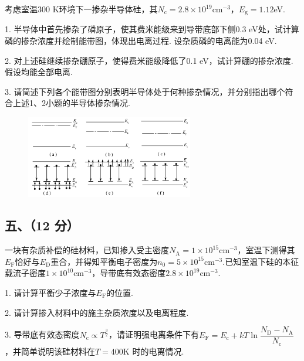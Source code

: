 \documentclass{ctexart}
\begin{document}
考虑室温300 K环境下一掺杂半导体硅，其$N_{\text{c}}=2.8\times 10^{19}$cm$^{-3}$，$E_\text{{g}} = 1.12$eV.\par
1. 半导体中首先掺杂了磷原子，使其费米能级来到导带底部下侧0.3 eV处，试计算磷的掺杂浓度并绘制能带图，体现出电离过程. 设杂质磷的电离能为0.04 eV.\par
2. 对上述硅继续掺杂硼原子，使得费米能级降低了0.1 eV，试计算硼的掺杂浓度. 假设均能全部电离.\par
3. 请简述下列各个能带图分别表明半导体处于何种掺杂情况，并分别指出哪个符合上述1、2小题的半导体掺杂情况.
\vspace{-0.3cm}
\begin{figure}[htbp]
    \flushright
    \includegraphics[width=0.65\textwidth]{2.png}
\end{figure}
\vspace{2.8cm}

\subsection*{五、（12 分）}
一块有杂质补偿的硅材料，已知掺入受主密度$N_\text{A} =1\times10^{15} \text{cm}^{-3}$，室温下测得其$E_\text{F}$恰好与$E_\text{D}$重合，并得知平衡电子密度为$n_0=5\times10^{15}\mathrm{cm}^{-3}$.已知室温下硅的本征载流子密度$1\times10^{10}\mathrm{cm}^{-3}$，导带底有效态密度$2.8\times10^{19}\text{cm}^{-3}$.\par
1. 请计算平衡少子浓度与$E_\text{F}$的位置.\par
2. 请计算掺入材料中的施主杂质浓度以及电离程度.\par
3. 导带底有效态密度$N_\text{c}\propto T^{\frac{3}{2}}$，请证明强电离条件下有$E_\text{F}=E_\text{c}+kT \ln \dfrac{N_\text{D} - N_\text{A}}{N_\text{c}}$，并简单说明该硅材料在$T=400$K 时的电离情况.

\newpage
\end{document}

